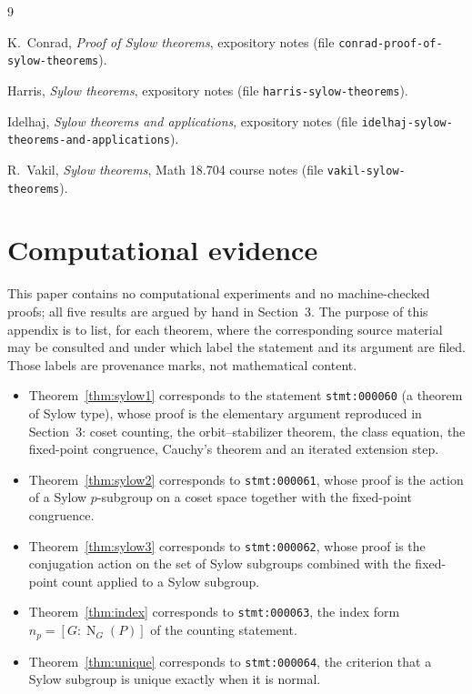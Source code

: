 \documentclass[11pt]{article}
\theoremstyle{definition}
\theoremstyle{remark}
\newcommand{\Norm}{\operatorname{N}}
\begin{document}
\begin{thebibliography}{9}

K.~Conrad,
\emph{Proof of Sylow theorems},
expository notes (file \texttt{conrad-proof-of-sylow-theorems}).

Harris,
\emph{Sylow theorems},
expository notes (file \texttt{harris-sylow-theorems}).

Idelhaj,
\emph{Sylow theorems and applications},
expository notes (file \texttt{idelhaj-sylow-theorems-and-applications}).

R.~Vakil,
\emph{Sylow theorems},
Math 18.704 course notes (file \texttt{vakil-sylow-theorems}).

\end{thebibliography}

\appendix

\section{Computational evidence}

This paper contains no computational experiments and no machine-checked proofs; all five results are argued by hand in Section~3. The purpose of this appendix is to list, for each theorem, where the corresponding source material may be consulted and under which label the statement and its argument are filed. Those labels are provenance marks, not mathematical content.

\begin{itemize}
\item Theorem~\ref{thm:sylow1} corresponds to the statement \texttt{stmt:000060} (a theorem of Sylow type), whose proof is the elementary argument reproduced in Section~3: coset counting, the orbit--stabilizer theorem, the class equation, the fixed-point congruence, Cauchy's theorem and an iterated extension step.
\item Theorem~\ref{thm:sylow2} corresponds to \texttt{stmt:000061}, whose proof is the action of a Sylow $p$-subgroup on a coset space together with the fixed-point congruence.
\item Theorem~\ref{thm:sylow3} corresponds to \texttt{stmt:000062}, whose proof is the conjugation action on the set of Sylow subgroups combined with the fixed-point count applied to a Sylow subgroup.
\item Theorem~\ref{thm:index} corresponds to \texttt{stmt:000063}, the index form $n_p=[G:\Norm_G(P)]$ of the counting statement.
\item Theorem~\ref{thm:unique} corresponds to \texttt{stmt:000064}, the criterion that a Sylow subgroup is unique exactly when it is normal.
\end{itemize}
\end{document}
